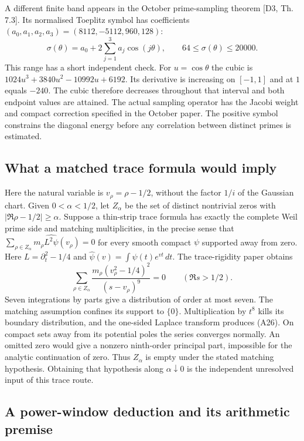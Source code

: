 \documentclass[
  10pt,
  a4paper,
  10pt,
  oneside,
  openany]{book}
\begin{document}
A different finite band appears in the October prime-sampling theorem
{[}D3, Th. 7.3{]}. Its normalised Toeplitz symbol has coefficients
\((a_0,a_1,a_2,a_3)=(8112,-5112,960,128)\): \[
 \sigma(\theta)=a_0+2\sum_{j=1}^{3}a_j\cos(j\theta),\qquad
 64\le\sigma(\theta)\le20000.
 \tag{A25}\label{eq:A25}
\] This range has a short independent check. For \(u=\cos\theta\) the
cubic is \(1024u^3+3840u^2-10992u+6192\). Its derivative is increasing
on \([-1,1]\) and at \(1\) equals \(-240\). The cubic therefore
decreases throughout that interval and both endpoint values are
attained. The actual sampling operator has the Jacobi weight and compact
correction specified in the October paper. The positive symbol
constrains the diagonal energy before any correlation between distinct
primes is estimated.

\subsection{What a matched trace formula would
imply}\label{what-a-matched-trace-formula-would-imply}

Here the natural variable is \(v_\rho=\rho-1/2\), without the factor
\(1/i\) of the Gaussian chart. Given \(0<\alpha<1/2\), let \(Z_\alpha\)
be the set of distinct nontrivial zeros with \(|\Re\rho-1/2|\ge\alpha\).
Suppose a thin-strip trace formula has exactly the complete Weil prime
side and matching multiplicities, in the precise sense that
\(\sum_{\rho\in Z_\alpha}m_\rho\widehat{L^2\psi}(v_\rho)=0\) for every
smooth compact \(\psi\) supported away from zero. Here
\(L=\partial_t^2-1/4\) and \(\widehat\psi(v)=\int\psi(t)e^{vt}\,dt\).
The trace-rigidity paper obtains \[
 \sum_{\rho\in Z_\alpha}
 \frac{m_\rho(v_\rho^2-1/4)^2}{(s-v_\rho)^9}=0
 \qquad(\Re s>1/2).
 \tag{A26}\label{eq:A26}
\] Seven integrations by parts give a distribution of order at most
seven. The matching assumption confines its support to \(\{0\}\).
Multiplication by \(t^8\) kills its boundary distribution, and the
one-sided Laplace transform produces (A26). On compact sets away from
its potential poles the series converges normally. An omitted zero would
give a nonzero ninth-order principal part, impossible for the analytic
continuation of zero. Thus \(Z_\alpha\) is empty under the stated
matching hypothesis. Obtaining that hypothesis along
\(\alpha\downarrow0\) is the independent unresolved input of this trace
route.

\subsection{A power-window deduction and its arithmetic
premise}\label{a-power-window-deduction-and-its-arithmetic-premise}
\end{document}
